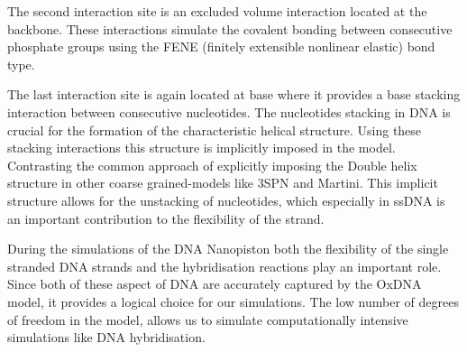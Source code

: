 The second interaction site is an excluded volume interaction located at the backbone.
These interactions simulate the covalent bonding between consecutive phosphate groups
using the FENE (finitely extensible nonlinear elastic) bond type.

The last interaction site is again located at base where it provides a base stacking
interaction between consecutive nucleotides. The nucleotides stacking in DNA is crucial
for the formation of the characteristic helical structure. Using these stacking
interactions this structure is implicitly imposed in the model. Contrasting the common
approach of explicitly imposing the Double helix structure in other coarse grained-models
like 3SPN and Martini. This implicit structure allows for the unstacking of nucleotides,
which especially in ssDNA is an important contribution to the flexibility of the strand.

During the simulations of the DNA Nanopiston both the flexibility of the single stranded
DNA strands and the hybridisation reactions play an important role. Since both of these
aspect of DNA are accurately captured by the OxDNA model, it provides a logical choice
for our simulations. The low number of degrees of freedom in the model, allows us to
simulate computationally intensive simulations like DNA hybridisation.
